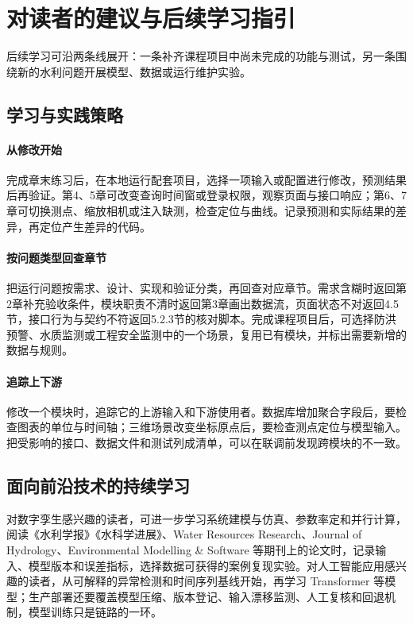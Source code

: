 \section{对读者的建议与后续学习指引}


后续学习可沿两条线展开：一条补齐课程项目中尚未完成的功能与测试，另一条围绕新的水利问题开展模型、数据或运行维护实验。

\subsection{学习与实践策略}

\paragraph{从修改开始}完成章末练习后，在本地运行配套项目，选择一项输入或配置进行修改，预测结果后再验证。第4、5章可改变查询时间窗或登录权限，观察页面与接口响应；第6、7章可切换测点、缩放相机或注入缺测，检查定位与曲线。记录预测和实际结果的差异，再定位产生差异的代码。

\paragraph{按问题类型回查章节}把运行问题按需求、设计、实现和验证分类，再回查对应章节。需求含糊时返回第2章补充验收条件，模块职责不清时返回第3章画出数据流，页面状态不对返回4.5节，接口行为与契约不符返回5.2.3节的核对脚本。完成课程项目后，可选择防洪预警、水质监测或工程安全监测中的一个场景，复用已有模块，并标出需要新增的数据与规则。

\paragraph{追踪上下游}修改一个模块时，追踪它的上游输入和下游使用者。数据库增加聚合字段后，要检查图表的单位与时间轴；三维场景改变坐标原点后，要检查测点定位与模型输入。把受影响的接口、数据文件和测试列成清单，可以在联调前发现跨模块的不一致。

\subsection{面向前沿技术的持续学习}

对数字孪生感兴趣的读者，可进一步学习系统建模与仿真、参数率定和并行计算，阅读《水利学报》《水科学进展》、Water Resources Research、Journal of Hydrology、Environmental Modelling \& Software 等期刊上的论文时，记录输入、模型版本和误差指标，选择数据可获得的案例复现实验。对人工智能应用感兴趣的读者，从可解释的异常检测和时间序列基线开始，再学习 Transformer 等模型；生产部署还要覆盖模型压缩、版本登记、输入漂移监测、人工复核和回退机制，模型训练只是链路的一环。

